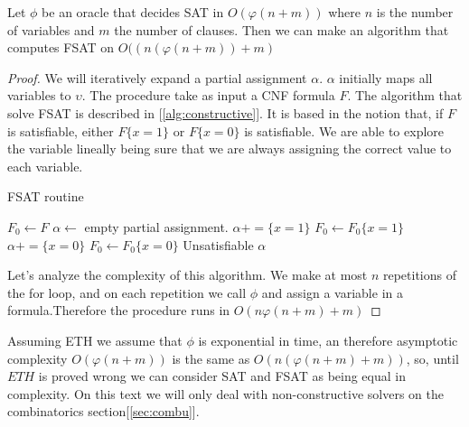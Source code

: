   \begin{proposition}
    Let $\phi$ be an oracle that decides SAT in $O(\varphi(n+m))$ where $n$ is the number of variables and $m$ the number of clauses. Then we can make an algorithm  that computes FSAT on $O((n(\varphi(n+m))+m)$ 
  \end{proposition}
  \begin{proof}
    We will iteratively expand a partial assignment $\alpha$. $\alpha$ initially maps all variables to $\upsilon$. The procedure take as input a CNF formula $F$. The algorithm that solve FSAT is described in [\ref{alg:constructive}]. It is based in the notion that, if  $F$ is satisfiable, either $F\{x=1\}$ or $F\{x=0\}$ is satisfiable. We are able to explore the variable lineally being sure that we are always assigning the correct value to each variable. 

    
    \begin{algorithm}
  \caption{FSAT routine}\label{alg:constructive}
  \begin{algorithmic}[1]

    
  \State $F_0 \gets F$
  \State $\alpha \gets$ empty partial assignment.
  \State
    \State $\alpha += \{x = 1\}$
    \State $F_0 \gets F_0\{x=1\}$
    \Else {} 
    \State $\alpha += \{x = 0\}$
    \State $F_0 \gets F_0\{x=0\}$
    \Else
    \State \Return Unsatisfiable
    \EndIf
    \EndIf
    \EndFor
    \State \Return $\alpha$
  \end{algorithmic}
\end{algorithm}

Let's analyze the complexity of this algorithm. We make at most $n$ repetitions of the for loop, and on each repetition we call $\phi$ and assign a variable in a formula.Therefore the procedure runs in $O(n\varphi(n+m)+m)$
\end{proof}

Assuming ETH we assume that $\phi$ is exponential in time, an therefore asymptotic complexity $O(\varphi(n+m))$ is the same as $O(n(\varphi(n+m)+m))$, so, until $ETH$ is proved wrong we can consider SAT and FSAT as being equal in complexity. On this text we will only deal with non-constructive  solvers on the combinatorics section[\ref{sec:combu}]. 
